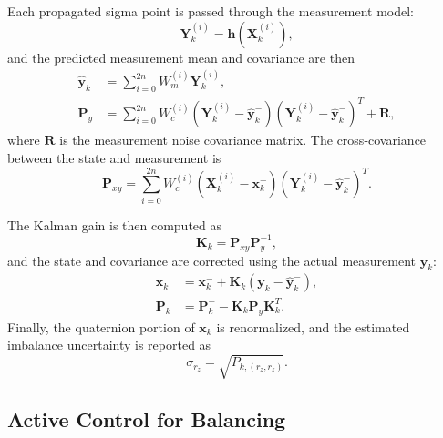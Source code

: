 Each propagated sigma point is passed through the measurement model:
\begin{equation}
    \bm{Y}_k^{(i)} = \bm{h}(\bm{X}_k^{(i)}),
\end{equation}
and the predicted measurement mean and covariance are then
\begin{align}
    \hat{\bm{y}}_k^- &= \sum_{i=0}^{2n} W_m^{(i)} \bm{Y}_k^{(i)},\\
    \bm{P}_y &= \sum_{i=0}^{2n} W_c^{(i)}(\bm{Y}_k^{(i)} - \hat{\bm{y}}_k^-)(\bm{Y}_k^{(i)} - \hat{\bm{y}}_k^-)^T + \bm{R},
\end{align}
where $\bm{R}$ is the measurement noise covariance matrix. The cross-covariance between the state and measurement is
\begin{equation}
    \bm{P}_{xy} = \sum_{i=0}^{2n} W_c^{(i)}(\bm{X}_k^{(i)} - \bm{x}_k^-)(\bm{Y}_k^{(i)} - \hat{\bm{y}}_k^-)^T.
\end{equation}

The Kalman gain is then computed as
\begin{equation}
    \bm{K}_k = \bm{P}_{xy}\bm{P}_y^{-1},
\end{equation}
and the state and covariance are corrected using the actual measurement $\bm{y}_k$:
\begin{align}
    \bm{x}_k &= \bm{x}_k^- + \bm{K}_k(\bm{y}_k - \hat{\bm{y}}_k^-),\\
    \bm{P}_k &= \bm{P}_k^- - \bm{K}_k\bm{P}_y\bm{K}_k^T.
\end{align}
Finally, the quaternion portion of $\bm{x}_k$ is renormalized, and the estimated imbalance uncertainty is reported as
\begin{equation}
    \sigma_{r_z} = \sqrt{P_{k,(r_z,r_z)}}.
\end{equation}

\subsection{Active Control for Balancing}\label{sec:active_methods}

